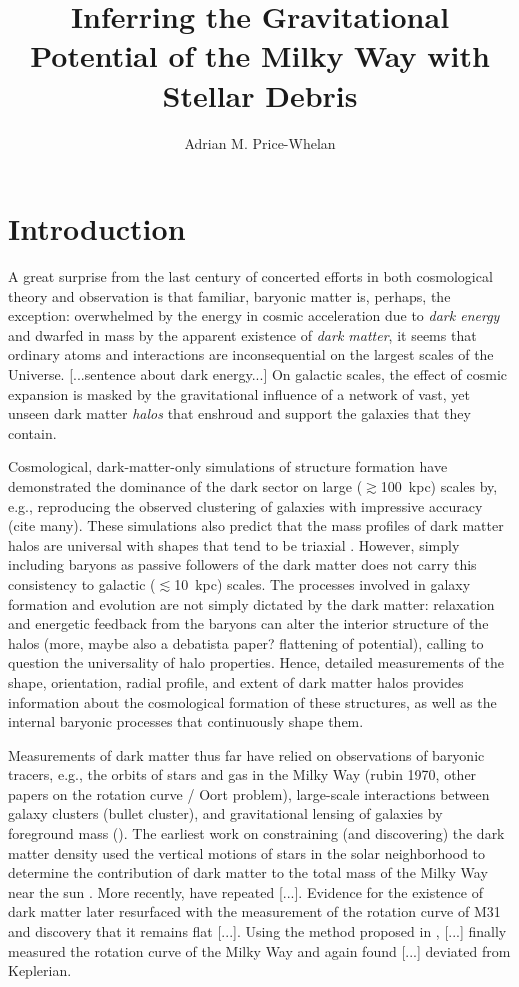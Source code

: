 \documentclass[letterpaper,12pt,preprint]{aastex}
\begin{document}
\title{Inferring the Gravitational Potential of the Milky Way with Stellar Debris}
\author{Adrian M. Price-Whelan}

\section{Introduction}

A great surprise from the last century of concerted efforts in both cosmological theory and observation is that familiar, baryonic matter is, perhaps, the exception: overwhelmed by the energy in cosmic acceleration due to \emph{dark energy} and dwarfed in mass by the apparent existence of \emph{dark matter}, it seems that ordinary atoms and interactions are inconsequential on the largest scales of the Universe. [...sentence about dark energy...] On galactic scales, the effect of cosmic expansion is masked by the gravitational influence of a network of vast, yet unseen dark matter \emph{halos} that enshroud and support the galaxies that they contain. 

Cosmological, dark-matter-only simulations of structure formation have demonstrated the dominance of the dark sector on large ($\gtrsim$100~kpc) scales by, e.g., reproducing the observed clustering of galaxies with impressive accuracy (cite many). These simulations also predict that the mass profiles of dark matter halos are universal with shapes that tend to be triaxial \citep{navarro96, others}. However, simply including baryons as passive followers of the dark matter does not carry this consistency to galactic ($\lesssim$10~kpc) scales. The processes involved in galaxy formation and evolution are not simply dictated by the dark matter: relaxation and energetic feedback from the baryons can alter the interior structure of the halos \citep[e.g.][]{bailin05, pontzen12} (more, maybe also a debatista paper? flattening of potential), calling to question the universality of halo properties. Hence, detailed measurements of the shape, orientation, radial profile, and extent of dark matter halos provides information about the cosmological formation of these structures, as well as the internal baryonic processes that continuously shape them.

Measurements of dark matter thus far have relied on observations of baryonic tracers, e.g., the orbits of stars and gas in the Milky Way (rubin 1970, other papers on the rotation curve / Oort problem), large-scale interactions between galaxy clusters (bullet cluster), and gravitational lensing of galaxies by foreground mass (). The earliest work on constraining (and discovering) the dark matter density used the vertical motions of stars in the solar neighborhood to determine the contribution of dark matter to the total mass of the Milky Way near the sun \citep[now known as the \emph{Oort Problem},][]{oort32}. More recently, \cite{bovy12} have repeated [...]. Evidence for the existence of dark matter later resurfaced with the measurement of the rotation curve of M31 \citep{rubin70} and discovery that it remains flat [...]. Using the method proposed in \cite{merrifield92}, [...] finally measured the rotation curve of the Milky Way and again found [...] deviated from Keplerian. 
\end{document}
